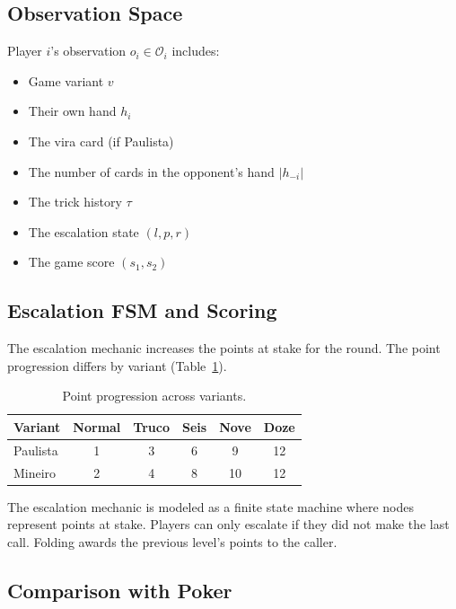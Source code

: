 \subsection{Observation Space}

Player $i$'s observation $o_i \in \mathcal{O}_i$ includes:
\begin{itemize}
    \item Game variant $v$
    \item Their own hand $h_i$
    \item The vira card (if Paulista)
    \item The number of cards in the opponent's hand $|h_{-i}|$
    \item The trick history $\tau$
    \item The escalation state $(l, p, r)$
    \item The game score $(s_1, s_2)$
\end{itemize}

\subsection{Escalation FSM and Scoring}

The escalation mechanic increases the points at stake for the round. The point progression differs by variant (Table~\ref{tab:scoring-variants}).

\begin{table}[h]
\centering
\caption{Point progression across variants.}
\label{tab:scoring-variants}
\begin{tabular}{lccccc}
\toprule
\textbf{Variant} & \textbf{Normal} & \textbf{Truco} & \textbf{Seis} & \textbf{Nove} & \textbf{Doze} \\
\midrule
Paulista & 1 & 3 & 6 & 9 & 12 \\
Mineiro  & 2 & 4 & 8 & 10 & 12 \\
\bottomrule
\end{tabular}
\end{table}

The escalation mechanic is modeled as a finite state machine where nodes represent points at stake. Players can only escalate if they did not make the last call. Folding awards the previous level's points to the caller.

\subsection{Comparison with Poker}

